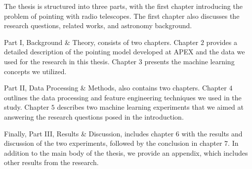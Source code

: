 The thesis is structured into three parts, with the first chapter introducing the problem of pointing with radio telescopes.
The first chapter also discusses the research questions, related works, and astronomy background.

Part I, Background \& Theory, consists of two chapters.
Chapter $2$ provides a detailed description of the pointing model developed at APEX and the data we used for the research in this thesis.
Chapter $3$ presents the machine learning concepts we utilized.

Part II, Data Processing \& Methods, also contains two chapters.
Chapter $4$ outlines the data processing and feature engineering techniques we used in the study.
Chapter $5$ describes two machine learning experiments that we aimed at answering the research questions posed in the introduction.

Finally, Part III, Results \& Discussion, includes chapter $6$ with the results and discussion of the two experiments, followed by the conclusion in chapter $7$.
In addition to the main body of the thesis, we provide an appendix, which includes other results from the research.